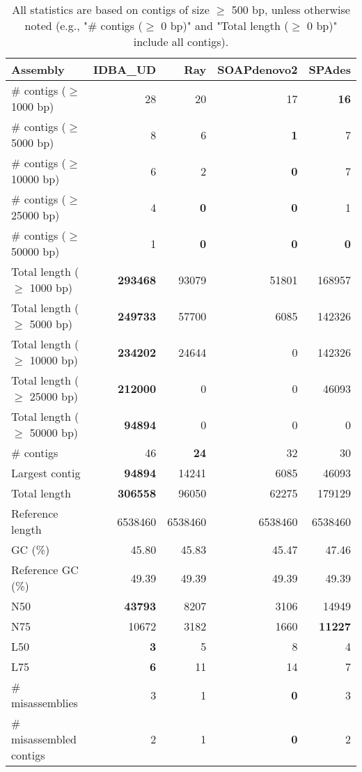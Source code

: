 \documentclass[12pt,a4paper]{article}
\begin{document}
\begin{table}[ht]
\begin{center}
\caption{All statistics are based on contigs of size $\geq$ 500 bp, unless otherwise noted (e.g., "\# contigs ($\geq$ 0 bp)" and "Total length ($\geq$ 0 bp)" include all contigs).}
\begin{tabular}{|l*{4}{|r}|}
\hline
Assembly & IDBA\_UD & Ray & SOAPdenovo2 & SPAdes \\ \hline
\# contigs ($\geq$ 1000 bp) & 28 & 20 & 17 & {\bf 16} \\ \hline
\# contigs ($\geq$ 5000 bp) & 8 & 6 & {\bf 1} & 7 \\ \hline
\# contigs ($\geq$ 10000 bp) & 6 & 2 & {\bf 0} & 7 \\ \hline
\# contigs ($\geq$ 25000 bp) & 4 & {\bf 0} & {\bf 0} & 1 \\ \hline
\# contigs ($\geq$ 50000 bp) & 1 & {\bf 0} & {\bf 0} & {\bf 0} \\ \hline
Total length ($\geq$ 1000 bp) & {\bf 293468} & 93079 & 51801 & 168957 \\ \hline
Total length ($\geq$ 5000 bp) & {\bf 249733} & 57700 & 6085 & 142326 \\ \hline
Total length ($\geq$ 10000 bp) & {\bf 234202} & 24644 & 0 & 142326 \\ \hline
Total length ($\geq$ 25000 bp) & {\bf 212000} & 0 & 0 & 46093 \\ \hline
Total length ($\geq$ 50000 bp) & {\bf 94894} & 0 & 0 & 0 \\ \hline
\# contigs & 46 & {\bf 24} & 32 & 30 \\ \hline
Largest contig & {\bf 94894} & 14241 & 6085 & 46093 \\ \hline
Total length & {\bf 306558} & 96050 & 62275 & 179129 \\ \hline
Reference length & 6538460 & 6538460 & 6538460 & 6538460 \\ \hline
GC (\%) & 45.80 & 45.83 & 45.47 & 47.46 \\ \hline
Reference GC (\%) & 49.39 & 49.39 & 49.39 & 49.39 \\ \hline
N50 & {\bf 43793} & 8207 & 3106 & 14949 \\ \hline
N75 & 10672 & 3182 & 1660 & {\bf 11227} \\ \hline
L50 & {\bf 3} & 5 & 8 & 4 \\ \hline
L75 & {\bf 6} & 11 & 14 & 7 \\ \hline
\# misassemblies & 3 & 1 & {\bf 0} & 3 \\ \hline
\# misassembled contigs & 2 & 1 & {\bf 0} & 2 \\ \hline

\end{tabular}
\end{center}
\end{table}
\end{document}
